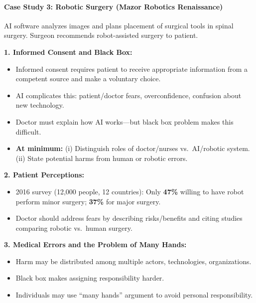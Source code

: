 \separator

\paragraph*{Case Study 3: Robotic Surgery (Mazor Robotics Renaissance)}

\begin{keybox}[Scenario]
AI software analyzes images and plans placement of surgical tools in spinal surgery. Surgeon recommends robot-assisted surgery to patient.
\end{keybox}

\begin{exbox}
\textbf{1. Informed Consent and Black Box:}
\begin{itemize}
  \item Informed consent requires patient to receive appropriate information from a competent source and make a voluntary choice.
  \item AI complicates this: patient/doctor fears, overconfidence, confusion about new technology.
  \item Doctor must explain how AI works---but black box problem makes this difficult.
  \item \textbf{At minimum:} (i) Distinguish roles of doctor/nurses vs.\ AI/robotic system. (ii) State potential harms from human or robotic errors.
\end{itemize}

\textbf{2. Patient Perceptions:}
\begin{itemize}
  \item 2016 survey (12,000 people, 12 countries): Only \textbf{47\%} willing to have robot perform minor surgery; \textbf{37\%} for major surgery.
  \item Doctor should address fears by describing risks/benefits and citing studies comparing robotic vs.\ human surgery.
\end{itemize}

\textbf{3. Medical Errors and the Problem of Many Hands:}
\begin{itemize}
  \item Harm may be distributed among multiple actors, technologies, organizations.
  \item Black box makes assigning responsibility harder.
  \item Individuals may use ``many hands'' argument to avoid personal responsibility.
\end{itemize}
\end{exbox}

